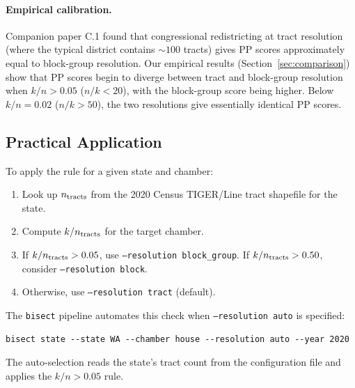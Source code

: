 \paragraph{Empirical calibration.}
Companion paper C.1 \citep{dellaLibera2026maup} found that congressional
redistricting at tract resolution (where the typical district contains
$\sim\!100$ tracts) gives PP scores approximately equal to block-group resolution.
Our empirical results (Section~\ref{sec:comparison}) show that PP scores begin
to diverge between tract and block-group resolution when $k/n > 0.05$
($n/k < 20$), with the block-group score being higher. Below $k/n = 0.02$
($n/k > 50$), the two resolutions give essentially identical PP scores.

\subsection{Practical Application}
\label{sec:rule:application}

To apply the rule for a given state and chamber:
\begin{enumerate}
  \item Look up $n_{\rm tracts}$ from the 2020 Census TIGER/Line tract shapefile
    for the state.
  \item Compute $k/n_{\rm tracts}$ for the target chamber.
  \item If $k/n_{\rm tracts} > 0.05$, use \texttt{--resolution block\_group}.
    If $k/n_{\rm tracts} > 0.50$, consider \texttt{--resolution block}.
  \item Otherwise, use \texttt{--resolution tract} (default).
\end{enumerate}

The \texttt{bisect} pipeline automates this check when
\texttt{--resolution auto} is specified:
\begin{verbatim}
bisect state --state WA --chamber house --resolution auto --year 2020
\end{verbatim}
The auto-selection reads the state's tract count from the configuration file
and applies the $k/n > 0.05$ rule.
